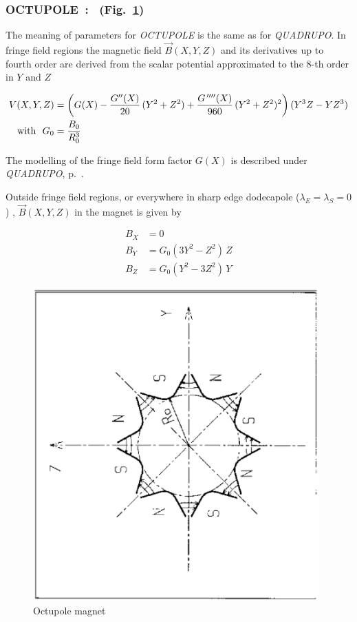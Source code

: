 {\newpage

\subsubsection*{OCTUPOLE~: \OCTUPOLETitl\  (Fig.~\protect\ref{fig24}) } \label{OCTUPOLE}  
\medskip 

 The meaning of parameters for \textsl{OCTUPOLE} is the same as for 
\textsl{QUADRUPO}.  In fringe field regions the magnetic field $ \vec  B(X,Y,Z)$ and 
its derivatives up to fourth order are derived from the scalar potential 
approximated to the 8-th order in $ Y $ and $ Z $

\begin{align*}
	V(X,Y,Z) &   =   \left(G(X)-\dfrac{G^{\prime\prime}(X) }{ 20} \, (Y^2+Z^2)+
	              \dfrac{G^{\,\prime\prime\prime\prime}(X) }{ 960}\, (Y^2+Z^2)^2 \right) (Y^3Z-YZ^3)   \\
	\text{with } ~ G_0 &   =  \dfrac{ B_0 }{ R^3_0} 
\end{align*}

\noindent The  modelling of the fringe field form factor  $G(X)$
 is described under \textsl{QUADRUPO}, p.~\pageref{QUADRUPO}. 

\medskip

\noindent Outside fringe field regions, or everywhere in sharp edge dodecapole
($ \lambda_ E=\lambda_ S=0$) , $ \vec  B(X,Y,Z) $ in the magnet is given by 

\begin{align*}
	B_X &   =   0 \\
	B_Y &   =   G_0(3Y^2-Z^2)\, Z  \\
	B_Z &   = G_0(Y^2-3Z^2) \, Y    
\end{align*}
\vfill

\begin{figure}[H]
\centerline{\includegraphics[height=12cm,angle=-90]{Fig24.ps}}
\caption{\label{fig24}Octupole magnet}
\end{figure}
\vfill

}
